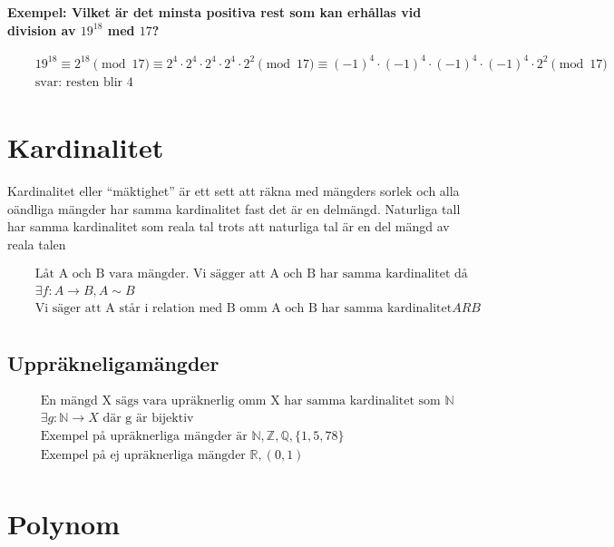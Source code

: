\documentclass{article}
\begin{document}
\textbf{Exempel: Vilket är det minsta positiva rest som kan erhållas vid division av $19^{18}$ med $17$? }\par
\begin{align*}
  &\quad  19^{18} \equiv 2^{18} \pmod{17} \equiv 2^4 \cdot 2^4 \cdot 2^4 \cdot 2^4 \cdot 2^2 \pmod{17}
  \equiv {(-1)}^4 \cdot {(-1)}^4 \cdot {(-1)}^4 \cdot {(-1)}^4 \cdot 2^2 \pmod{17} \\
  &\quad \text{svar: resten blir } 4 \\
\end{align*}


\newpage

\section{Kardinalitet}
Kardinalitet eller ``mäktighet'' är ett sett att räkna med mängders sorlek och alla
oändliga mängder har samma kardinalitet fast det är en delmängd. Naturliga tall har samma
kardinalitet som reala tal trots att naturliga tal är en del mängd av reala talen

\begin{align*}
  &\quad \text{Låt A och B vara mängder. Vi sägger att A och B har samma kardinalitet då det finns en bijektion} \\
  &\quad \exists f: A \to B, A \sim B \\
  &\quad \text{Vi säger att A står i relation med B omm A och B har samma kardinalitet} ARB \\
\end{align*}

\subsection{Uppräkneligamängder}
\begin{align*}
  &\quad \text{En mängd X sägs vara upräknerlig omm X har samma kardinalitet som } \mathbb{N}  \\
  &\quad \exists g: \mathbb{N} \to X \text{ där g är bijektiv} \\
  &\quad \text{Exempel på upräknerliga mängder är } \mathbb{N}, \mathbb{Z}, \mathbb{Q}, \{ 1,5,78 \} \\
  &\quad \text{Exempel på ej upräknerliga mängder } \mathbb{R}, (0,1) \\ 
\end{align*}


\newpage

\section{Polynom}
\end{document}
